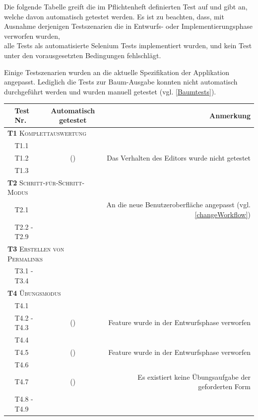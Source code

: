 \documentclass[parskip=full,11pt,openany]{scrreprt}
\newcommand{\cmark}{\ding{51}}%
\newcommand{\xmark}{\ding{55}}%
\begin{document}
Die folgende Tabelle greift die im Pflichtenheft definierten Test auf und gibt an,
welche davon automatisch getestet werden. 
Es ist zu beachten, dass, mit Ausnahme derjenigen Testszenarien die in Entwurfs- oder
Implementierungsphase verworfen wurden, \\ alle Tests als automatisierte Selenium Tests implementiert wurden, und kein Test unter den vorausgesetzten Bedingungen fehlschlägt.

Einige Testszenarien wurden an die aktuelle Spezifikation der Applikation angepasst. 
Lediglich die Tests zur Baum-Ausgabe konnten nicht automatisch durchgeführt werden und wurden manuell getestet (vgl. \ref{Baumtests}).

\begin{table}[h]
	\centering
	\begin{tabular}{@{}ll|c|r@{}}
		\toprule
		&\textbf{Test Nr.} & \makecell{\textbf{Automatisch}\\\textbf{getestet}} &\textbf{Anmerkung} \\ 
		\midrule
		\multicolumn{3}{l|}{\small \textsc{\textbf{T1} Komplettauswertung}} \\ 
		&T1.1 & \cmark & \\
		&T1.2 & (\cmark) & Das Verhalten des Editors wurde nicht getestet \\
		&T1.3 & \cmark & \\ 
		\multicolumn{3}{l|}{\small \textsc{\textbf{T2} Schritt-für-Schritt-Modus}}\\ 
		&T2.1 & \cmark & An die neue Benutzeroberfläche angepasst (vgl. \ref{changeWorkflow}) \\
		&T2.2 - T2.9 & \cmark & \\
		\multicolumn{3}{l|}{\small \textsc{\textbf{T3} Erstellen von Permalinks}}\\ 	
		&T3.1 - T3.4 & \cmark & \\
		\multicolumn{3}{l|}{\small \textsc{\textbf{T4} Übungsmodus}}\\ 
		&T4.1 & \cmark & \\
		&T4.2 - T4.3 & (\xmark) & Feature wurde in der Entwurfsphase verworfen \\
		&T4.4 & \cmark & \\
		&T4.5 & (\xmark) & Feature wurde in der Entwurfsphase verworfen \\
		&T4.6 & \cmark & \\
		&T4.7 & (\xmark) & Es existiert keine Übungsaufgabe der geforderten Form \\
		&T4.8 - T4.9 & \cmark & \\

\end{tabular}
\end{table}
\end{document}
